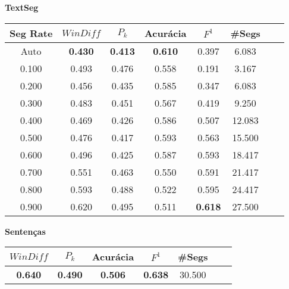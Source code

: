 \documentclass{article}
\begin{document}

 {  
\large
\center
	\textbf{TextSeg}  

}

\begin{longtable}[c]{|c|c|c|c|c|c|c|c|} 
\hline 
 Seg Rate & $WinDiff$ & $P_k$ & Acurácia & $F^1$ & \#Segs\\ \hline 
 Auto & \cellcolor{gray!20} \textbf{0.430} & \cellcolor{gray!20} \textbf{0.413} & \cellcolor{gray!20} \textbf{0.610} & 0.397 & 6.083  \\ \hline 
 0.100 & 0.493 & 0.476 & 0.558 & 0.191 & 3.167  \\ \hline 
 0.200 & 0.456 & 0.435 & 0.585 & 0.347 & 6.083  \\ \hline 
 0.300 & 0.483 & 0.451 & 0.567 & 0.419 & 9.250  \\ \hline 
 0.400 & 0.469 & 0.426 & 0.586 & 0.507 & 12.083  \\ \hline 
 0.500 & 0.476 & 0.417 & 0.593 & 0.563 & 15.500  \\ \hline 
 0.600 & 0.496 & 0.425 & 0.587 & 0.593 & 18.417  \\ \hline 
 0.700 & 0.551 & 0.463 & 0.550 & 0.591 & 21.417  \\ \hline 
 0.800 & 0.593 & 0.488 & 0.522 & 0.595 & 24.417  \\ \hline 
 0.900 & 0.620 & 0.495 & 0.511 & \cellcolor{gray!20} \textbf{0.618} & 27.500  \\ \hline 
 \end{longtable} 







{  
\large
\center
	\textbf{Sentenças}  

}

\begin{longtable}[c]{|c|c|c|c|c|c|c|} 
\hline 
 $WinDiff$ & $P_k$ & Acurácia & $F^1$ & \#Segs\\ \hline 
 \cellcolor{gray!20} \textbf{0.640} & \cellcolor{gray!20} \textbf{0.490} & \cellcolor{gray!20} \textbf{0.506} & \cellcolor{gray!20} \textbf{0.638} & 30.500  \\ \hline 
 \end{longtable} 

\newpage
\end{document}
